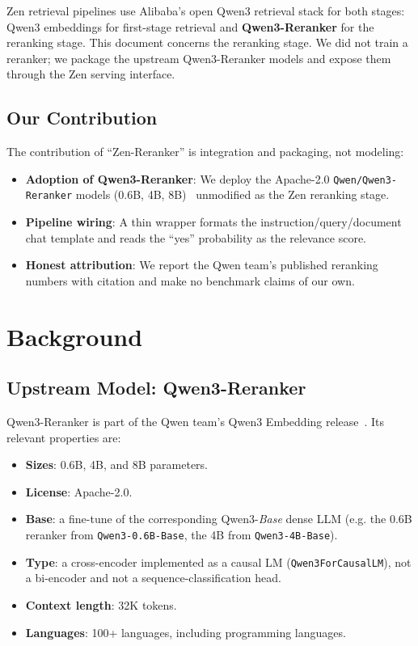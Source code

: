 \documentclass[11pt,letterpaper]{article}
\begin{document}
Zen retrieval pipelines use Alibaba's open Qwen3 retrieval stack for both stages: Qwen3
embeddings for first-stage retrieval and \textbf{Qwen3-Reranker} for the reranking stage.
This document concerns the reranking stage. We did not train a reranker; we package the
upstream Qwen3-Reranker models and expose them through the Zen serving interface.

\subsection{Our Contribution}

The contribution of ``Zen-Reranker'' is integration and packaging, not modeling:

\begin{itemize}
    \item \textbf{Adoption of Qwen3-Reranker}: We deploy the Apache-2.0 \texttt{Qwen/Qwen3-Reranker}
          models (0.6B, 4B, 8B)~\cite{qwen3embedding} unmodified as the Zen reranking stage.
    \item \textbf{Pipeline wiring}: A thin wrapper formats the instruction/query/document chat
          template and reads the ``yes'' probability as the relevance score.
    \item \textbf{Honest attribution}: We report the Qwen team's published reranking numbers
          with citation and make no benchmark claims of our own.
\end{itemize}

\section{Background}

\subsection{Upstream Model: Qwen3-Reranker}

Qwen3-Reranker is part of the Qwen team's Qwen3 Embedding release~\cite{qwen3embedding}. Its
relevant properties are:

\begin{itemize}
    \item \textbf{Sizes}: 0.6B, 4B, and 8B parameters.
    \item \textbf{License}: Apache-2.0.
    \item \textbf{Base}: a fine-tune of the corresponding Qwen3-\emph{Base} dense LLM
          (e.g. the 0.6B reranker from \texttt{Qwen3-0.6B-Base}, the 4B from \texttt{Qwen3-4B-Base}).
    \item \textbf{Type}: a cross-encoder implemented as a causal LM (\texttt{Qwen3ForCausalLM}),
          not a bi-encoder and not a sequence-classification head.
    \item \textbf{Context length}: 32K tokens.
    \item \textbf{Languages}: 100+ languages, including programming languages.
\end{itemize}
\end{document}
